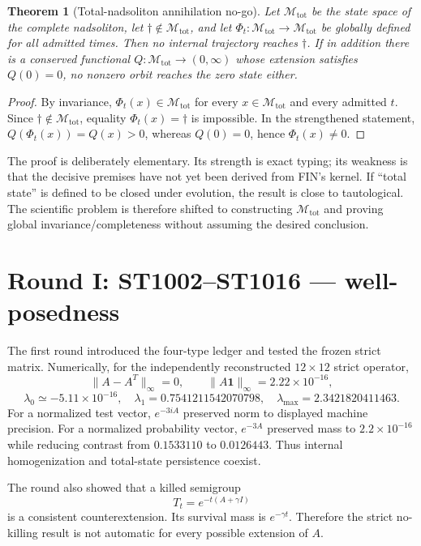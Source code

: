 \documentclass[11pt,a4paper]{article}
\newtheorem{theorem}{Theorem}
\newcommand{\Mtot}{\mathcal M_{\mathrm{tot}}}
\newcommand{\nothingstate}{\dagger}
\begin{document}
\begin{theorem}[Total-nadsoliton annihilation no-go]
Let $\Mtot$ be the state space of the complete nadsoliton, let
$\nothingstate\notin\Mtot$, and let $\Phi_t:\Mtot\to\Mtot$ be globally
defined for all admitted times.  Then no internal trajectory reaches
$\nothingstate$.  If in addition there is a conserved functional
$Q:\Mtot\to(0,\infty)$ whose extension satisfies $Q(0)=0$, no nonzero orbit
reaches the zero state either.
\end{theorem}

\begin{proof}
By invariance, $\Phi_t(x)\in\Mtot$ for every $x\in\Mtot$ and every admitted
$t$.  Since $\nothingstate\notin\Mtot$, equality
$\Phi_t(x)=\nothingstate$ is impossible.  In the strengthened statement,
$Q(\Phi_t(x))=Q(x)>0$, whereas $Q(0)=0$, hence $\Phi_t(x)\ne0$.
\end{proof}

The proof is deliberately elementary.  Its strength is exact typing; its
weakness is that the decisive premises have not yet been derived from FIN's
kernel.  If ``total state'' is defined to be closed under evolution, the
result is close to tautological.  The scientific problem is therefore shifted
to constructing $\Mtot$ and proving global invariance/completeness without
assuming the desired conclusion.

\section{Round I: ST1002--ST1016 --- well-posedness}

The first round introduced the four-type ledger and tested the frozen strict
matrix.  Numerically, for the independently reconstructed $12\times12$
strict operator,
\[
 \|A-A^T\|_\infty=0,
 \qquad \|A\mathbf1\|_\infty=2.22\times10^{-16},
\]
\[
 \lambda_0\simeq-5.11\times10^{-16},\quad
 \lambda_1=0.7541211542070798,\quad
 \lambda_{\max}=2.3421820411463.
\]
For a normalized test vector, $e^{-3iA}$ preserved norm to displayed machine
precision.  For a normalized probability vector, $e^{-3A}$ preserved mass to
$2.2\times10^{-16}$ while reducing contrast from $0.1533110$ to $0.0126443$.
Thus internal homogenization and total-state persistence coexist.

The round also showed that a killed semigroup
\[
 T_t=e^{-t(A+\gamma I)}
\]
is a consistent counterextension.  Its survival mass is $e^{-\gamma t}$.
Therefore the strict no-killing result is not automatic for every possible
extension of $A$.
\end{document}
